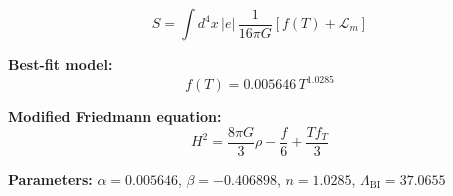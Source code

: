 
\begin{equation}
  S = \int d^4x \, |e| \, \frac{1}{16\pi G} \left[ f(T) + \mathcal{L}_m \right]
\end{equation}

\textbf{Best-fit model:}
\begin{equation}
  f(T) = 0.005646 \, T^{1.0285}
\end{equation}

\textbf{Modified Friedmann equation:}
\begin{equation}
  H^2 = \frac{8\pi G}{3} \rho - \frac{f}{6} + \frac{T f_T}{3}
\end{equation}

\textbf{Parameters:}
$\alpha = 0.005646$, \quad
$\beta = -0.406898$, \quad
$n = 1.0285$, \quad
$\Lambda_{\text{BI}} = 37.0655$